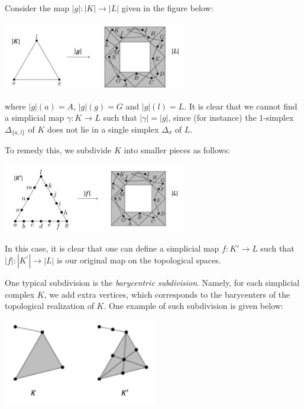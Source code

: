 \begin{example} Consider the map \(\left| g\right|  : \left| K\right|  \rightarrow  \left| L\right|\) given in the figure below:
\begin{center}
\includegraphics[width=0.6\textwidth]{images/Ch5_no_simplicial_map.jpg}
\end{center}
where \(\left| g\right| \left( a\right) = A\), \(\left| g\right| \left( g\right) = G\) and \(\left| g\right| \left( l\right) = L\). It is clear that we cannot find a 
simplicial map $\gamma: K \to L$ such that $|\gamma| = |g|$, since (for instance) the $1$-simplex $\Delta_{\{a,l\}}$ of $K$ does not lie in a single simplex $\Delta_{\sigma}$ of $L$. 

To remedy this, we subdivide \(K\) into smaller pieces as follows:
\begin{center}
\includegraphics[width=0.6\textwidth]{images/Ch5_subdivide_map.jpg}
\end{center}
In this case, it is clear that 
one can define a simplicial map $f:K' \to L$ such that
\(\left| f\right|  : \left| {K}^{\prime }\right|  \rightarrow  \left| L\right|\) is our original map on the topological spaces.
\end{example}

\begin{example}  One typical subdivision is the \emph{barycentric subdivision}. Namely, for each simplicial complex $K$, we add extra vertices, which corresponds to the barycenters of the topological realization of $K$. One example of such subdivision is given below:
\begin{center}
\includegraphics[width=0.5\textwidth]{images/Ch5_barycentric.jpg}
\end{center}
\end{example}

